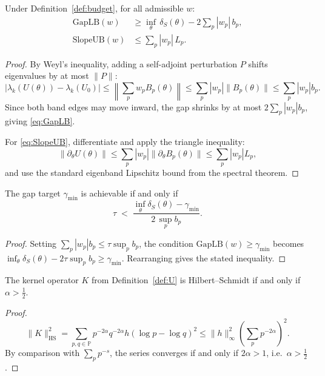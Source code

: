 \documentclass[11pt]{article}
\begin{document}
\begin{theorem}
\label{thm:ZMcert}
Under Definition~\ref{def:budget}, for all admissible $w$:
\begin{align}
\mathrm{GapLB}(w) &\geq \inf_{\theta}\,\delta_{S}(\theta)
               - 2\sum_{p}|w_{p}|\,b_{p}, \label{eq:GapLB}\\
\mathrm{SlopeUB}(w) &\leq \sum_{p}|w_{p}|\,L_{p}. \label{eq:SlopeUB}
\end{align}
\end{theorem}

\begin{proof}
By Weyl's inequality, adding a self-adjoint perturbation $P$
shifts eigenvalues by at most $\|P\|$:
\[
\left|\lambda_{k}(U(\theta))-\lambda_{k}(U_{0})\right|
\leq \left\|\sum_{p}w_{p}B_{p}(\theta)\right\|
\leq \sum_{p}|w_{p}|\|B_{p}(\theta)\|
\leq \sum_{p}|w_{p}|b_{p}.
\]
Since both band edges may move inward, the gap shrinks by at most
$2\sum_{p}|w_{p}|b_{p}$, giving \eqref{eq:GapLB}.

For \eqref{eq:SlopeUB}, differentiate and apply the triangle inequality:
\[
\|\partial_{\theta}U(\theta)\|
\leq \sum_{p}|w_{p}|\|\partial_{\theta}B_{p}(\theta)\|
\leq \sum_{p}|w_{p}|L_{p},
\]
and use the standard eigenband Lipschitz bound
from the spectral theorem.
\end{proof}

\begin{corollary}
\label{cor:certifiable}
The gap target $\gamma_{\min}$ is achievable if and only if
\[
\tau \;<\; \frac{\inf_{\theta}\delta_{S}(\theta) - \gamma_{\min}}{2\,\sup_{p}b_{p}}.
\]
\end{corollary}

\begin{proof}
Setting $\sum_{p}|w_{p}|b_{p}\leq\tau\sup_{p}b_{p}$,
the condition $\mathrm{GapLB}(w)\geq\gamma_{\min}$
becomes $\inf_{\theta}\delta_{S}(\theta)-2\tau\sup_{p}b_{p}\geq\gamma_{\min}$.
Rearranging gives the stated inequality.
\end{proof}

\begin{proposition}
\label{prop:HS}
The kernel operator $K$ from Definition~\ref{def:U}
is Hilbert--Schmidt if and only if $\alpha>\tfrac{1}{2}$.
\end{proposition}

\begin{proof}
\[
\|K\|_{\mathrm{HS}}^{2}
= \sum_{p,q\in\mathbb{P}} p^{-2\alpha}q^{-2\alpha}h(\log p-\log q)^{2}
\leq \|h\|_{\infty}^{2}\!\left(\sum_{p}p^{-2\alpha}\right)^{\!2}.
\]
By comparison with $\sum_{p}p^{-s}$,
the series converges if and only if $2\alpha>1$, i.e.\ $\alpha>\tfrac{1}{2}$.
\end{proof}
\end{document}
